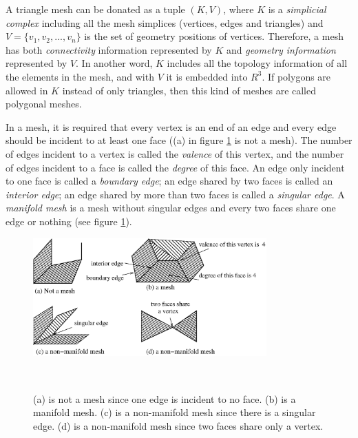 \documentclass[11pt, a4paper]{report}
\begin{document}
    A triangle mesh can be donated as a tuple $(K, V)$, where $K$ is a
    \emph{simplicial complex} including all the mesh simplices 
    (vertices, edges and triangles) and $V =\{v_{1}, v_{2}, ...,
    v_{n}\}$ is the set of geometry positions of vertices. Therefore,
    a mesh has both \emph{connectivity} information represented by $K$
    and \emph{geometry information} represented by $V$. In another
    word, $K$ includes all the topology information of all the
    elements in the mesh, and with $V$ it is embedded into $R^{3}$. If
    polygons are allowed in $K$ instead of only triangles, then this
    kind of meshes are called polygonal meshes.

    In a mesh, it is required that every
    vertex is an end of an edge and every edge should be incident to at
    least one face ((a) in figure \ref{mesh_non_mesh} is not a mesh).
    The number of edges incident to a vertex is called the
    \emph{valence} of this vertex, and the number of edges incident to
    a face is called the \emph{degree} of this face. An edge only
    incident to one face is called a \emph{boundary edge}; an edge
    shared by two faces is called an \emph{interior edge}; an edge
    shared by more than two faces is called a \emph{singular edge}. A
    \emph{manifold mesh} is a mesh without singular edges and every
    two faces share one edge or nothing (see figure \ref{mesh_non_mesh}).
\begin{figure}
\centering
\includegraphics[width=0.8\textwidth]{figure2.1.eps}
\caption[Manifold mesh, non-manifold mesh and non-mesh]{ (a) is not
a mesh since one edge is incident to no face. (b) is a manifold
mesh. (c) is a non-manifold mesh since there is a singular edge.
(d) is a non-manifold mesh since two faces share only a
vertex.\label{mesh_non_mesh}}\
\end{figure}
\end{document}
